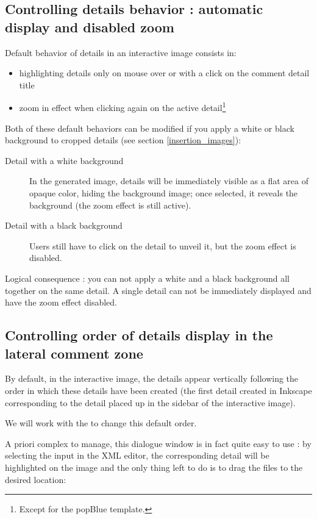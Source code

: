 \subsection{Controlling details behavior : automatic display and disabled zoom}\label{white_black_background}
\label{XML_layer}

Default behavior of details in an interactive image consists in:
\begin{itemize}
 \item highlighting details only on mouse over or with a click on the comment 
 detail title
 \item zoom in effect when clicking again on the active detail\footnote{Except 
 for the popBlue template.}
\end{itemize}

Both of these default behaviors can be modified if you apply a white
 or black background to cropped details (see section 
\ref{insertion_images}):
\begin{description}
 \item [Detail with a white background] In the generated image, details will be
 immediately visible as a flat area of opaque color, hiding the background image;  
 once selected, it reveals the background (the zoom effect is still active).
 \item [Detail with a black background] Users still have to click on the detail to unveil it, but the zoom effect is disabled.
\end{description}

Logical consequence : you can not apply a white and a black background all together on the same detail.
A single detail can not be immediately displayed and have the zoom effect disabled.

\subsection{Controlling order of details display in the lateral comment zone}

By default, in the interactive image, the details appear vertically following the order
in which these details have been created (the first detail created in Inkscape corresponding 
to the detail placed up in the sidebar of the interactive image).

We will work with the  to change this default order.

A priori complex to manage, this dialogue window is in fact quite easy to use : 
by selecting the input in the XML editor, the corresponding detail will be
highlighted on the image and the only thing left 
to do is to drag the files to the desired location:\\

